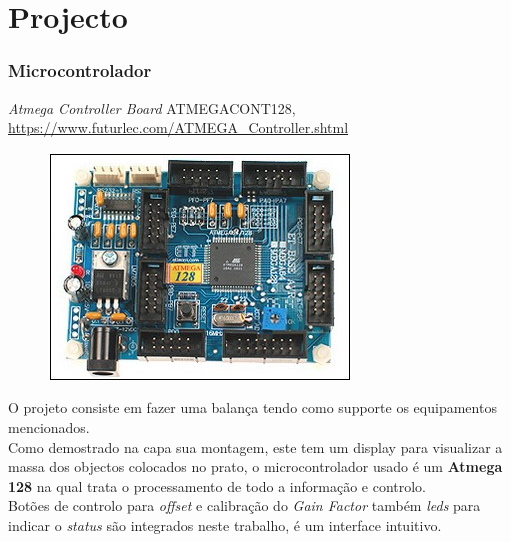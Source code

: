 \section{Projecto}
\begin{frame}
	\frametitle{Microcontrolador}
	\textit{Atmega Controller Board} ATMEGACONT128, \url{https://www.futurlec.com/ATMEGA_Controller.shtml}
	\begin{figure}[H]
		\flushleft
		\includegraphics[scale=0.35]{./image/PESTA/kit/DevBoard_2.jpg}
	\end{figure}
	O projeto consiste em fazer uma balança tendo como supporte os equipamentos mencionados.\\
	Como demostrado na capa sua montagem, este tem um display para visualizar a massa dos objectos colocados no prato, o microcontrolador usado é um \textbf{Atmega 128} na qual trata o processamento de todo a informação e controlo.\\
	Botões de controlo para \textit{offset} e calibração do \textit{Gain Factor} também \textit{leds} para indicar o \textit{status} são integrados neste trabalho, é um interface intuitivo.
\end{frame}
